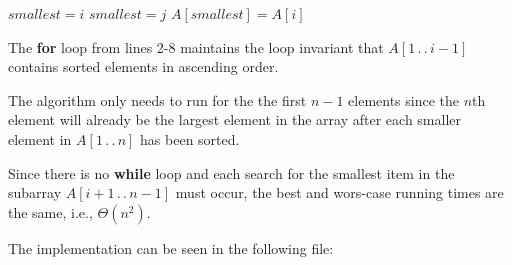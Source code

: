 
\begin{algorithmic}[1]
        \STATE $\mathit{smallest} = i$
                \STATE $\mathit{smallest} = j$
            \ENDIF
        \ENDFOR
        \STATE $A[\mathit{smallest}] = A[i]$
    \ENDFOR
\end{algorithmic}

The \textbf{for} loop from lines 2-8 maintains the loop invariant that $A[1\, .\, .\, i-1]$
contains sorted elements in ascending order. 

The algorithm only needs to run for the the first $n - 1$ elements since the $n$th 
element will already be the largest element in the array after each smaller element 
in $A[1\, .\, .\, n]$ has been sorted.

Since there is no \textbf{while} loop and each search for the smallest item in the subarray
$A[i + 1\, .\, .\, n - 1]$ must occur, the best and wors-case running times are the same,
i.e., $\Theta(n^2)$.

The implementation can be seen in the following file:

